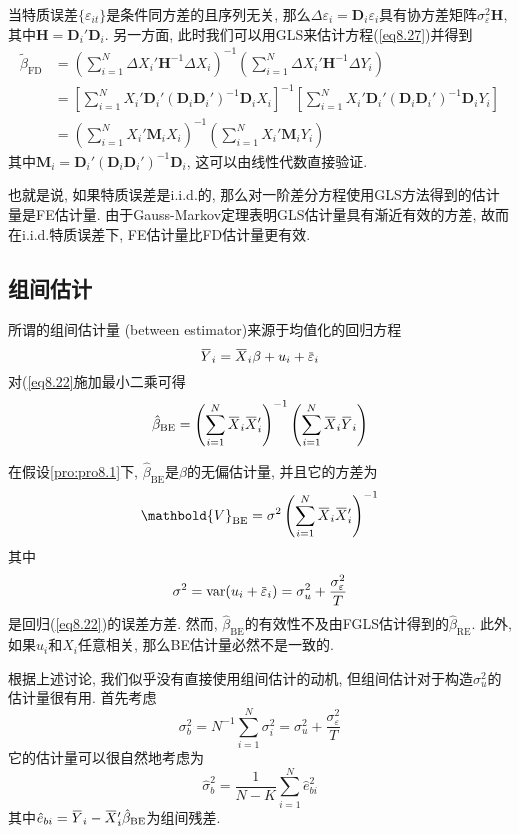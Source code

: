 \documentclass[cn, 12pt, math=mtpro2, bibstyle=apa, blue, twocol]{elegantbook}
\newcommand{\hb}{\hat{\beta}}
\newcommand{\V}{\mathbold{V}}
\newcommand{\overbar}[1]{\mkern 1.5mu\overline{\mkern-1.5mu#1\mkern-1.5mu}\mkern 1.5mu}
\begin{document}
当特质误差$\{\varepsilon_{it}\}$是条件同方差的且序列无关, 那么$\Delta\varepsilon_i=\mathbold{D}_i\varepsilon_i$具有协方差矩阵$\sigma_\varepsilon^2\mathbold{H}$, 其中$\mathbold{H}=\mathbold{D}_i'\mathbold{D}_i$. 另一方面, 此时我们可以用GLS来估计方程(\ref{eq8.27})并得到
\begin{align*}
\tilde{\beta}_{\text{FD}}&=\left(\sum_{i=1}^{N}\Delta X_i'\mathbold{H}^{-1}\Delta X_i\right)^{-1}\left(\sum_{i=1}^{N}\Delta X_i'\mathbold{H}^{-1}\Delta Y_i\right) \\
&=\left[\sum_{i=1}^{N}X_i'\mathbold{D}_i'(\mathbold{D}_i\mathbold{D}_i')^{-1}\mathbold{D}_iX_i\right]^{-1}\left[\sum_{i=1}^{N}X_i'\mathbold{D}_i'(\mathbold{D}_i\mathbold{D}_i')^{-1}\mathbold{D}_iY_i\right] \\
&=\left(\sum_{i=1}^{N}X_i'\mathbold{M}_iX_i\right)^{-1}\left(\sum_{i=1}^{N}X_i'\mathbold{M}_iY_i\right)
\end{align*}
其中$\mathbold{M}_i=\mathbold{D}_i'(\mathbold{D}_i\mathbold{D}_i')^{-1}\mathbold{D}_i$, 这可以由线性代数直接验证.

也就是说, 如果特质误差是i.i.d.的, 那么对一阶差分方程使用GLS方法得到的估计量是FE估计量. 由于Gauss-Markov定理表明GLS估计量具有渐近有效的方差, 故而在i.i.d.特质误差下, FE估计量比FD估计量更有效.

\subsection{组间估计}
所谓的组间估计量 (between estimator)来源于均值化的回归方程
\begin{equation}\label{eq8.22}
  \overbar{Y}_i=\overbar{X}_i\beta+u_i+\overbar{\varepsilon}_i
\end{equation}
对(\ref{eq8.22}施加最小二乘可得
\begin{align*}
\hat{\beta}_{\text{BE}}=\left(\sum_{i=1}^{N}\overbar{X}_i\overbar{X}_i'\right)^{-1}\left(\sum_{i=1}^{N}\overbar{X}_i\overbar{Y}_i\right)
\end{align*}


在假设\ref{pro:pro8.1}下, $\hb_{\text{BE}}$是$\beta$的无偏估计量, 并且它的方差为
$$\V_{\text{BE}}=\sigma^2\left(\sum_{i=1}^{N}\overbar{X}_i\overbar{X}_i'\right)^{-1}$$
其中
$$\sigma^2=\text{var}(u_i+\overbar{\varepsilon}_i)=\sigma_u^2+\frac{\sigma^2_\varepsilon}{T}$$
是回归(\ref{eq8.22})的误差方差. 然而, $\hb_{\text{BE}}$的有效性不及由FGLS估计得到的$\hb_{\text{RE}}$. 此外, 如果$u_i$和$X_i$任意相关, 那么BE估计量必然不是一致的.

根据上述讨论, 我们似乎没有直接使用组间估计的动机, 但组间估计对于构造$\sigma_u^2$的估计量很有用. 首先考虑
\begin{equation}\label{eq8.25}
  \sigma_b^2=N^{-1}\sum_{i=1}^{N}\sigma_i^2=\sigma_u^2+\frac{\sigma^2_\varepsilon}{T}
\end{equation}
它的估计量可以很自然地考虑为
\begin{equation}\label{eq8.23}
  \hat{\sigma}_b^2=\frac{1}{N-K}\sum_{i=1}^{N}\hat{e}_{bi}^2
\end{equation}
其中$\hat{e}_{bi}=\overbar{Y}_i-\overbar{X}_i'\hb_{\text{BE}}$为组间残差.
\end{document}
